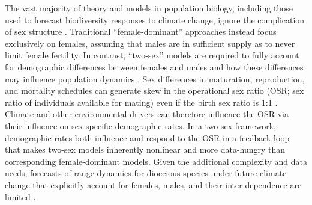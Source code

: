 \documentclass[9pt,twocolumn,twoside,lineno]{pnas-new}
\begin{document}
The vast majority of theory and models in population biology, including those used to forecast biodiversity responses to climate change, ignore the complication of sex structure \citep[but see][] {pottier2021sexual,ellis2017does,Elena}.
Traditional ``female-dominant'' approaches instead focus exclusively on females, assuming that males are in sufficient supply as to never limit female fertility. 
In contrast, ``two-sex'' models are required to fully account for demographic differences between females and males and how these differences may influence population dynamics \citep{gerber2014two,miller2011sex}. 
Sex differences in maturation, reproduction, and mortality schedules can generate skew in the operational sex ratio (OSR; sex ratio of individuals available for mating) even if the birth sex ratio is 1:1 \citep{eberhart2017sex,shelton2010ecological}. 
Climate and other environmental drivers can therefore influence the OSR via their influence on sex-specific demographic rates. 
In a two-sex framework, demographic rates both influence and respond to the OSR in a feedback loop that makes two-sex models inherently nonlinear and more data-hungry than corresponding female-dominant models. 
Given the additional complexity and data needs, forecasts of range dynamics for dioecious species under future climate change that explicitly account for females, males, and their inter-dependence are limited \citep{petry2016sex,lynch2014climate}.
\end{document}

